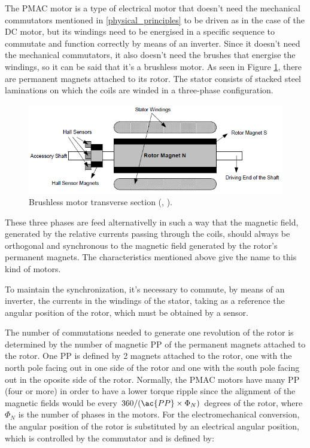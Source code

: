 The \acf{PMAC} motor is a type of electrical motor that doesn't need the mechanical commutators mentioned in \ref{physical_principles} to be driven as in the case of the DC motor, but its windings need to be energised in a specific sequence to commutate and function correctly by means of an inverter. Since it doesn't need the mechanical commutators, it also doesn't need the brushes that energise the windings, so it can be said that it's a brushless motor. As seen in Figure \ref{fig:brushless_section}, there are permanent magnets attached to its rotor. The stator consists of stacked steel laminations on which the coils are winded in a three-phase configuration.

\begin{figure}[htbp]
	\centering
	\includegraphics[width=12cm]{Images/brushless_section.png} 
	\caption[Brushless Motor Transverse Section]{Brushless motor transverse section (\citeauthor{microchipBLDC}, \citeyear{microchipBLDC}).}
	\label{fig:brushless_section}
\end{figure}

These three phases are feed alternativelly in such a way that the magnetic field, generated by the relative currents passing through the coils, should always be orthogonal and synchronous to the magnetic field generated by the rotor's permanent magnets. The characteristics mentioned above give the name to this kind of motors. 

To maintain the synchronization, it's necessary to commute, by means of an inverter, the currents in the windings of the stator, taking as a reference the angular position of the rotor, which must be obtained by a sensor.

The number of commutations needed to generate one revolution of the rotor is determined by the number of magnetic \acf{PP} of the permanent magnets attached to the rotor. One \ac{PP} is defined by 2 magnets attached to the rotor, one with the north pole facing out in one side of the rotor and one with the south pole facing out in the oposite side of the rotor. Normally, the \ac{PMAC} motors have many \ac{PP} (four or more) in order to have a lower torque ripple since the alignment of the magnetic fields would be every $360/(\ac{PP} \times \Phi_{N})$ degrees of the rotor, where $\Phi_{N}$ is the number of phases in the motors. For the electromechanical conversion, the angular position of the rotor is substituted by an electrical angular position, which is controlled by the commutator and is defined by:

